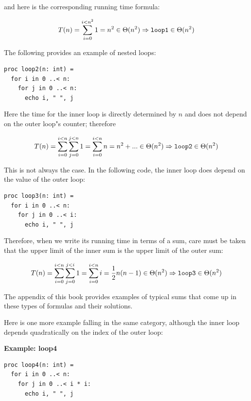 \documentclass[justified, sixbynine]{tufte-book}
\def\subsubsection#1{{\bf #1}}
\theoremstyle{plain}%
\newtheorem * {corollary}{Corollary}
\theoremstyle{definition}
\theoremstyle{remark}
\newtheorem * {remark}{Remark}
\newtheorem * {note}{Note}
\begin{document}
\begin{fullwidth}
and here is the corresponding running time formula:

\begin{equation}
T(n)=\sum_{i=0}^{i<n^2}1=n^2\in \Theta (n^2)\Rightarrow \text{{\tt loop1}}%
\in \Theta (n^2)
\end{equation}

The following provides an example of nested loops:

\begin{lstlisting}
proc loop2(n: int) =
  for i in 0 ..< n:
    for j in 0 ..< n:
      echo i, " ", j
\end{lstlisting}

Here the time for the inner loop is directly determined by $n$ and does not depend on the outer loop"s counter; therefore

\begin{equation}
T(n)=\sum_{i=0}^{i<n}\sum_{j=0}^{j<n}1=\sum_{i=0}^{i<n}n=n^2+...\in \Theta
(n^2)\Rightarrow \text{{\tt loop2}}\in \Theta (n^2)
\end{equation}

This is not always the case. In the following code, the inner loop does depend on the value of the outer loop:

\begin{lstlisting}
proc loop3(n: int) =
  for i in 0 ..< n:
    for j in 0 ..< i:
      echo i, " ", j
\end{lstlisting}

Therefore, when we write its running time in terms of a sum, care must be taken that the upper limit of the inner sum is the upper limit of the outer sum:

\begin{equation}
T(n)=\sum_{i=0}^{i<n}\sum_{j=0}^{j<i}1=\sum_{i=0}^{i<n}i=\frac 12n(n-1)\in
\Theta (n^2)\Rightarrow \text{{\tt loop3}}\in \Theta (n^2)
\end{equation}

The appendix of this book provides examples of typical sums that come up in these types of formulas and their solutions.

Here is one more example falling in the same category, although the inner loop depends quadratically on the index of the outer loop:

\subsubsection{Example: loop4}
\begin{lstlisting}
proc loop4(n: int) =
  for i in 0 ..< n:
    for j in 0 ..< i * i:
      echo i, " ", j
\end{lstlisting}


\end{fullwidth}
\end{document}

